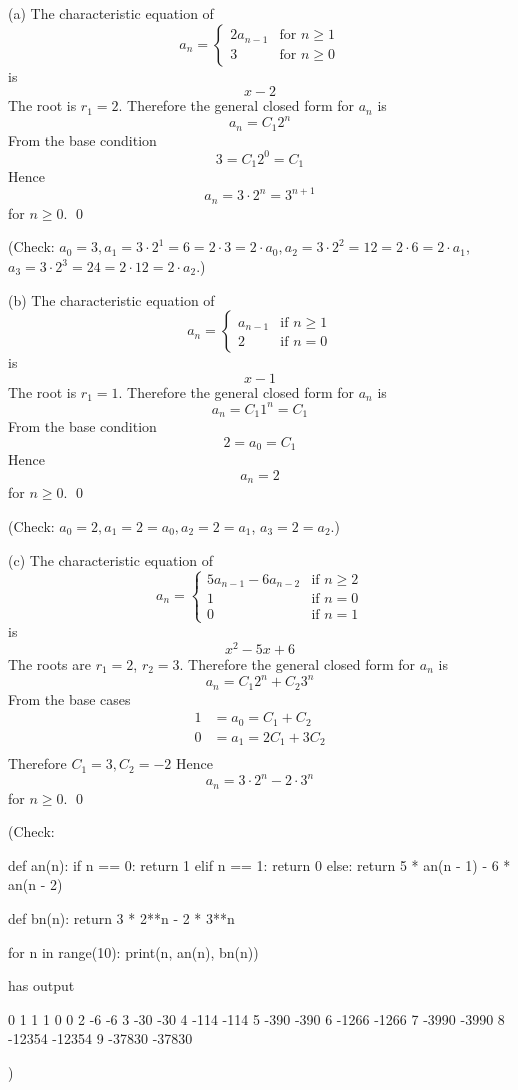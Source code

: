 
(a)
The characteristic equation of
\[
a_n = 
\begin{cases}
  2 a_{n-1}  &\text{for $n \geq 1$} \\
  3         &\text{for $n \geq 0$}
\end{cases}
\]
is
\[
x - 2
\]
The root is $r_1 = 2$.
Therefore the general closed form for $a_n$ is
\[
a_n = C_1 2^n
\]
From the base condition
\[
3 = C_1 2^0 = C_1
\]
Hence
\[
a_n = 3 \cdot 2^n = 3^{n + 1}
\]
for $n \geq 0$.
\qed

(Check: $a_0 = 3, a_1 = 3 \cdot 2^1 = 6 = 2 \cdot 3 = 2 \cdot a_0, a_2 = 3 \cdot 2^2 = 12 = 2 \cdot 6 = 2 \cdot a_1$, $a_3 = 3 \cdot 2^3 = 24 = 2 \cdot 12 = 2 \cdot a_2$.)


(b)
The characteristic equation of
\[
a_n = 
\begin{cases}
  a_{n-1}  &\text{if } n \geq 1 \\
  2       &\text{if } n = 0
\end{cases}
\]
is
\[
x - 1
\]
The root is $r_1 = 1$.
Therefore the general closed form for $a_n$ is
\[
a_n = C_1 1^n = C_1
\]
From the base condition
\[
2 = a_0 = C_1
\]
Hence
\[
a_n = 2 
\]
for $n \geq 0$.
\qed

(Check: $a_0 = 2, a_1 = 2 = a_0, a_2 = 2 = a_1$, $a_3 = 2 = a_2$.)


(c)
The characteristic equation of
\[
a_n = 
\begin{cases}
  5 a_{n-1} - 6 a_{n-2} &\text{if } n \geq 2 \\
  1                   &\text{if } n = 0  \\
  0                   &\text{if } n = 1 
\end{cases}
\]
is
\[
x^2 - 5x + 6
\]
The roots are $r_1 = 2$, $r_2 = 3$.
Therefore the general closed form for $a_n$ is
\[
a_n = C_1 2^n + C_2 3^n
\]
From the base cases
\begin{align*}
1 &= a_0 = C_1 + C_2 \\
0 &= a_1 = 2C_1 + 3C_2 \\
\end{align*}
Therefore $C_1 = 3, C_2 = -2$
Hence
\[
a_n = 3 \cdot 2^n - 2 \cdot 3^n
\]
for $n \geq 0$.
\qed

(Check:
\begin{console}[fontsize=\footnotesize]
def an(n):
    if n == 0: return 1
    elif n == 1: return 0
    else: return 5 * an(n - 1) - 6 * an(n - 2)

def bn(n):
    return 3 * 2**n - 2 * 3**n

for n in range(10):
    print(n, an(n), bn(n))
\end{console}
has output
\begin{console}[fontsize=\footnotesize]
0 1 1
1 0 0
2 -6 -6
3 -30 -30
4 -114 -114
5 -390 -390
6 -1266 -1266
7 -3990 -3990
8 -12354 -12354
9 -37830 -37830
\end{console}
)


